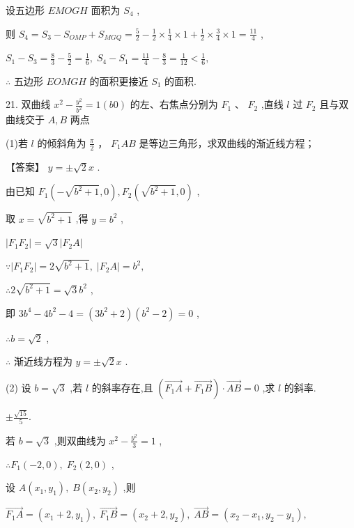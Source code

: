\documentclass[10pt]{article}
\begin{document}
设五边形 \({EMOGH}\) 面积为 \({S}_{4}\) ,

则 \({S}_{4} = {S}_{3} - {S}_{OMP} + {S}_{MGQ} = \frac{5}{2} - \frac{1}{2} \times  \frac{1}{4} \times  1 + \frac{1}{2} \times  \frac{3}{4} \times  1 = \frac{11}{4}\) ,

\({S}_{1} - {S}_{3} = \frac{8}{3} - \frac{5}{2} = \frac{1}{6},\;{S}_{4} - {S}_{1} = \frac{11}{4} - \frac{8}{3} = \frac{1}{12} < \frac{1}{6},\)

\(\therefore\) 五边形 \({EOMGH}\) 的面积更接近 \({S}_{1}\) 的面积.

21. 双曲线 \({x}^{2} - \frac{{y}^{2}}{{b}^{2}} = 1\left( {b0}\right)\) 的左、右焦点分别为 \({F}_{1}\text{ 、 }{F}_{2}\) ,直线 \(l\) 过 \({F}_{2}\) 且与双曲线交于 \(A,B\) 两点

(1)若 \(l\) 的倾斜角为 \(\frac{\pi }{2}\) ， \({F}_{1}{AB}\) 是等边三角形，求双曲线的渐近线方程；

【答案】 \(y =  \pm  \sqrt{2}x\) .

由已知 \({F}_{1}\left( {-\sqrt{{b}^{2} + 1},0}\right) ,{F}_{2}\left( {\sqrt{{b}^{2} + 1},0}\right)\) ,

取 \(x = \sqrt{{b}^{2} + 1}\) ,得 \(y = {b}^{2}\) ,

\(\left| {{F}_{1}{F}_{2}}\right|  = \sqrt{3}\left| {{F}_{2}A}\right|\)

\(\because \left| {{F}_{1}{F}_{2}}\right|  = 2\sqrt{{b}^{2} + 1},\;\left| {{F}_{2}A}\right|  = {b}^{2},\)

\(\therefore 2\sqrt{{b}^{2} + 1} = \sqrt{3}{b}^{2}\) ,

即 \(3{b}^{4} - 4{b}^{2} - 4 = \left( {3{b}^{2} + 2}\right) \left( {{b}^{2} - 2}\right)  = 0\) ,

\(\therefore b = \sqrt{2}\) ,

\(\therefore\) 渐近线方程为 \(y =  \pm  \sqrt{2}x\) .

(2) 设 \(b = \sqrt{3}\) ,若 \(l\) 的斜率存在,且 \(\left( {\overrightarrow{{F}_{1}A} + \overrightarrow{{F}_{1}B}}\right)  \cdot  \overrightarrow{AB} = 0\) ,求 \(l\) 的斜率.

\(\pm  \frac{\sqrt{15}}{5}.\)

若 \(b = \sqrt{3}\) ,则双曲线为 \({x}^{2} - \frac{{y}^{2}}{3} = 1\) ,

\(\therefore {F}_{1}\left( {-2,0}\right) ,\;{F}_{2}\left( {2,0}\right)\) ,

设 \(A\left( {{x}_{1},{y}_{1}}\right) ,\;B\left( {{x}_{2},{y}_{2}}\right)\) ,则

\(\overrightarrow{{F}_{1}A} = \left( {{x}_{1} + 2,{y}_{1}}\right) ,\;\overrightarrow{{F}_{1}B} = \left( {{x}_{2} + 2,{y}_{2}}\right) ,\;\overrightarrow{AB} = \left( {{x}_{2} - {x}_{1},{y}_{2} - {y}_{1}}\right) ,\)
\end{document}
